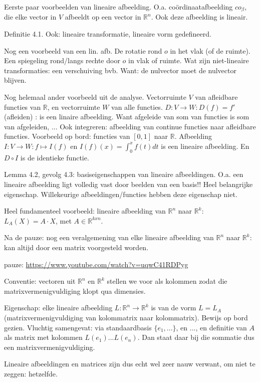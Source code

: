 \documentclass{article}
\begin{document}
Eerste paar voorbeelden van lineaire afbeelding. O.a. co\"ordinaatafbeelding $co_\beta$, die elke vector in $V$ afbeeldt op een vector in $\mathbb{R}^n$. Ook deze afbeelding is lineair. 

Definitie 4.1. Ook: lineaire transformatie, lineaire vorm gedefineerd. 

Nog een voorbeeld van een lin. afb. De rotatie rond $o$ in het vlak (of de ruimte). Een spiegeling rond/langs rechte door $o$ in vlak of ruimte. Wat zijn niet-lineaire transformaties: een verschuiving bvb. Want: de nulvector moet de nulvector blijven. 

Nog helemaal ander voorbeeld uit de analyse. Vectorruimte $V$ van afleidbare functies van $\mathbb{R}$, en vectorruimte $W$ van alle functies. $D: V \to W: D(f) = f'$ (afleiden) : is een linaire afbeelding. Want afgeleide van som van functies is som van afgeleiden, ... 
Ook integreren: afbeelding van continue functies naar afleidbare functies. Voorbeeld op bord: functies van $[0,1]$ naar $\mathbb{R}$. Afbeelding $I: V \to W: f \mapsto I(f)$ en $I(f)(x) = \int_0^x f(t)dt$ is een lineaire afbeelding. En $D \circ I $ is de identieke functie. 

Lemma 4.2, gevolg 4.3: basiseigenschappen van lineaire afbeeldingen. O.a. een lineaire afbeelding ligt volledig vast door beelden van een basis!! Heel belangrijke eigenschap. Willekeurige afbeeldingen/functies hebben deze eigenschap niet. 

Heel fundamenteel voorbeeld: lineaire afbeelding van $\mathbb{R}^n$ naar $\mathbb{R}^k$: $L_A(X)=A \cdot X$, met $A \in \mathbb{R}^{kxn}$. 

Na de pauze: nog een veralgemening van elke lineaire afbeelding van $\mathbb{R}^n$ naar $\mathbb{R}^k$: kan altijd door een matrix voorgesteld worden. 

pauze: \url{https://www.youtube.com/watch?v=uqwC41RDPyg} 

Conventie: vectoren uit $\mathbb{R}^n$ en $\mathbb{R}^k$ stellen we voor als kolommen zodat die matrixvermenigvuldiging klopt qua dimensies. 

Eigenschap: elke lineaire afbeelding $L: \mathbb{R}^n \to \mathbb{R}^k$ is van de vorm $L=L_A$ (matrixvermenigvuldiging van kolommatrix naar kolommatrix). 
Bewijs op bord gezien. 
Vluchtig samengevat: via standaardbasis $\{ e_1, ...\}$, en ..., en definitie van $A$ als matrix met kolommen $L(e_1) ... L(e_n)$. Dan staat daar bij die sommatie dus een matrixvermenigvuldiging. 

Lineaire afbeeldingen en matrices zijn dus echt wel zeer nauw verwant, om niet te zeggen: hetzelfde. 
\end{document}
